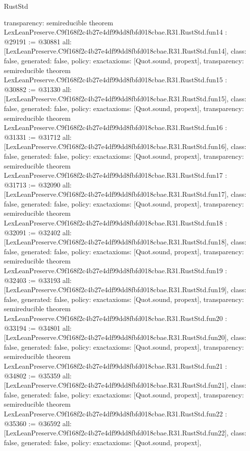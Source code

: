 \begin{lexlean}{RustStd}
\begin{coremodule}
{  transparency: semireducible
}
theorem LexLeanPreserve.C9f168f2c4b27e4df99dd8fbfd018cbae.R31.RustStd.fun14 : @29191 := @30881 {
  all: [LexLeanPreserve.C9f168f2c4b27e4df99dd8fbfd018cbae.R31.RustStd.fun14],
  class: false,
  generated: false,
  policy: exact{axioms: [Quot.sound, propext]},
  transparency: semireducible
}
theorem LexLeanPreserve.C9f168f2c4b27e4df99dd8fbfd018cbae.R31.RustStd.fun15 : @30882 := @31330 {
  all: [LexLeanPreserve.C9f168f2c4b27e4df99dd8fbfd018cbae.R31.RustStd.fun15],
  class: false,
  generated: false,
  policy: exact{axioms: [Quot.sound, propext]},
  transparency: semireducible
}
theorem LexLeanPreserve.C9f168f2c4b27e4df99dd8fbfd018cbae.R31.RustStd.fun16 : @31331 := @31712 {
  all: [LexLeanPreserve.C9f168f2c4b27e4df99dd8fbfd018cbae.R31.RustStd.fun16],
  class: false,
  generated: false,
  policy: exact{axioms: [Quot.sound, propext]},
  transparency: semireducible
}
theorem LexLeanPreserve.C9f168f2c4b27e4df99dd8fbfd018cbae.R31.RustStd.fun17 : @31713 := @32090 {
  all: [LexLeanPreserve.C9f168f2c4b27e4df99dd8fbfd018cbae.R31.RustStd.fun17],
  class: false,
  generated: false,
  policy: exact{axioms: [Quot.sound, propext]},
  transparency: semireducible
}
theorem LexLeanPreserve.C9f168f2c4b27e4df99dd8fbfd018cbae.R31.RustStd.fun18 : @32091 := @32402 {
  all: [LexLeanPreserve.C9f168f2c4b27e4df99dd8fbfd018cbae.R31.RustStd.fun18],
  class: false,
  generated: false,
  policy: exact{axioms: [Quot.sound, propext]},
  transparency: semireducible
}
theorem LexLeanPreserve.C9f168f2c4b27e4df99dd8fbfd018cbae.R31.RustStd.fun19 : @32403 := @33193 {
  all: [LexLeanPreserve.C9f168f2c4b27e4df99dd8fbfd018cbae.R31.RustStd.fun19],
  class: false,
  generated: false,
  policy: exact{axioms: [Quot.sound, propext]},
  transparency: semireducible
}
theorem LexLeanPreserve.C9f168f2c4b27e4df99dd8fbfd018cbae.R31.RustStd.fun20 : @33194 := @34801 {
  all: [LexLeanPreserve.C9f168f2c4b27e4df99dd8fbfd018cbae.R31.RustStd.fun20],
  class: false,
  generated: false,
  policy: exact{axioms: [Quot.sound, propext]},
  transparency: semireducible
}
theorem LexLeanPreserve.C9f168f2c4b27e4df99dd8fbfd018cbae.R31.RustStd.fun21 : @34802 := @35359 {
  all: [LexLeanPreserve.C9f168f2c4b27e4df99dd8fbfd018cbae.R31.RustStd.fun21],
  class: false,
  generated: false,
  policy: exact{axioms: [Quot.sound, propext]},
  transparency: semireducible
}
theorem LexLeanPreserve.C9f168f2c4b27e4df99dd8fbfd018cbae.R31.RustStd.fun22 : @35360 := @36592 {
  all: [LexLeanPreserve.C9f168f2c4b27e4df99dd8fbfd018cbae.R31.RustStd.fun22],
  class: false,
  generated: false,
  policy: exact{axioms: [Quot.sound, propext]},
}
\end{coremodule}
\end{lexlean}
